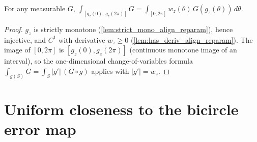 \begin{lemma}

  \label{lem:align_reparam_change_of_var}
  For any measurable $G$,
  $\int_{[g_z(0),\,g_z(2\pi)]} G
     = \int_{[0,2\pi]} w_z(\theta)\,G(g_z(\theta))\,d\theta$.
\end{lemma}
\begin{proof}
  \leanok
  $g_z$ is strictly monotone (\cref{lem:strict_mono_align_reparam}), hence injective,
  and $C^1$ with derivative $w_z\ge 0$ (\cref{lem:has_deriv_align_reparam}). The
  image of $[0,2\pi]$ is $[g_z(0),g_z(2\pi)]$ (continuous monotone image of an
  interval), so the one-dimensional change-of-variables formula
  $\int_{g(S)}G=\int_S |g'|\,(G\circ g)$ applies with $|g'|=w_z$.
\end{proof}

\section{Uniform closeness to the bicircle error map}

